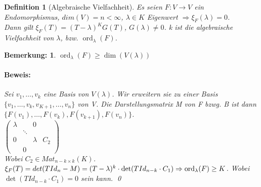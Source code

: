\documentclass{report}
\newcommand{\lb}{\lambda}
\DeclareMathOperator{\ord}{ord}
\theoremstyle{customrem}
\newtheorem*{bemerkung}{Bemerkung\textnormal:}
\theoremstyle{customdef}
\newtheorem{definition}{Definition}[chapter]
\renewenvironment{proof}{\paragraph{Beweis: }}{\qed}
\theoremstyle{customenv}
\begin{document}
\begin{definition}[Algebraische Vielfachheit]
  Es seien \(F : V \to V\) ein Endomorphismus, \(dim(V) = n < \infty\),
  \(\lb \in K\) Eigenwert \(\Rightarrow \xi_F(\lb) = 0\).\\
  Dann gilt  \(\xi_F(T) = (T-\lb)^K G(T)\), \(G(\lb) \neq 0\). k ist die
  algebraische Vielfachheit von \(\lb\), bzw. \(\ord_\lb(F)\).
\end{definition}

\begin{bemerkung}
  \(\ord_\lb(F) \ge \dim(V(\lb))\)\\
  \begin{proof}
    Sei \({v_1, \dots, v_k}\) eine Basis von \(V(\lb)\). Wir erweitern sie zu
    einer Basis \(\{v_1, \dots, v_k, v_{K+1}, \dots, v_n\}\) von V. Die
    Darstellungsmatrix M von F bzwg. B ist dann\\
    \(\{F(v_1), \dots, F(v_k), F(v_{k+1}), F(v_n)\}\).\\
    \(
      \begin{pmatrix}
        \lb &        & 0         & \\
            & \ddots &           & \\
        0   &        &  \lambda  & C_2 \\
            & 0  
      \end{pmatrix}
    \)\\
    Wobei \(C_2 \in Mat_{n-k \times k}(K)\).\\
    \(
      \xi_F(T) = det(T Id_n - M)
      = (T - \lb)^k \cdot \det(T Id_{n-k} \cdot C_1)\\
      \Rightarrow \ord_\lb(F) \ge K
    \). Wobei \(\det(T Id_{n-k} \cdot C_1) = 0\) sein kann.
  \end{proof}
\end{bemerkung}
\end{document}
